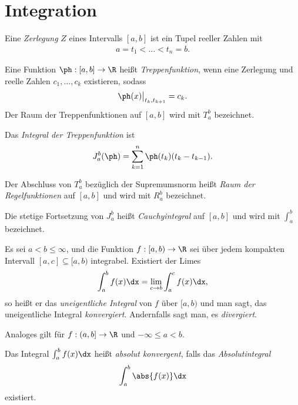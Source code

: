 \section{Integration}

\begin{defn}
Eine \emph{Zerlegung} $Z$ eines Intervalls $[a,b]$ ist ein Tupel reeller Zahlen
mit
\begin{align*}
a = t_1 < \ldots < t_n = b.
\end{align*}
\end{defn}
\begin{defn}
Eine Funktion $\ph: [a,b]\to\R$ heißt \emph{Treppenfunktion}, wenn eine
Zerlegung und reelle Zahlen $c_1, \ldots, c_k$ existieren, sodass
\begin{align*}
\ph(x)\big|_{t_k,t_{k+1}} = c_k.
\end{align*}
Der Raum der Treppenfunktionen auf $[a,b]$ wird mit $T_a^b$ bezeichnet.
\end{defn}
\begin{defn}
Das \emph{Integral der Treppenfunktion} ist
\begin{align*}
J_a^b(\ph) = \sum \limits_{k=1}^{n} \ph(t_k)(t_{k} - t_{k-1}).
\end{align*}
\end{defn}
\begin{defn}
Der Abschluss von $T_a^b$ bezüglich der Supremumsnorm heißt \emph{Raum der
Regelfunktionen} auf $[a,b]$ und wird mit $R_a^b$ bezeichnet.

Die stetige Fortsetzung von $J_a^b$ heißt \emph{Cauchyintegral} auf $[a,b]$ und
wird mit $\int_a^b$ bezeichnet.
\end{defn}
\begin{defn}
Es sei $a<b\le\infty$, und die Funktion $f: [a,b)\to \R$ sei über jedem
kompakten Intervall $[a,c]\subseteq [a,b)$ integrabel. Existiert der Limes
\begin{align*}
\int_a^b f(x)\dx = \lim_{c\to b}\int_a^c f(x)\dx,
\end{align*}
so heißt er das \emph{uneigentliche Integral} von $f$ über $[a,b)$ und man sagt,
das uneigentliche Integral \emph{konvergiert}. Andernfalls sagt man, es
\emph{divergiert}.

Analoges gilt für $f: (a,b]\to\R$ und $-\infty \le a < b$.
\end{defn}
\begin{defn}
Das Integral $\int_a^b f(x)\dx$ heißt \emph{absolut konvergent}, falls
das \emph{Absolutintegral}
\begin{align*}
\int_a^b \abs{f(x)}\dx
\end{align*}
existiert.
\end{defn}

